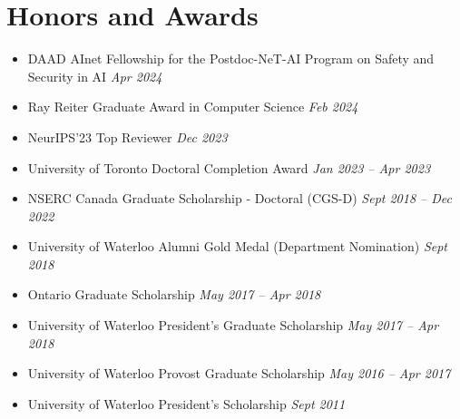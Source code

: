 \section*{Honors and Awards}
\vspace{\postsubhead}
\begin{adjustwidth}{\indentleft}{\indentright}
  \begin{itemize}
    \setlength\itemsep{0.2em}

    \item DAAD AInet Fellowship for the Postdoc-NeT-AI Program on Safety and Security in AI
    \hfill
    \textit{Apr 2024}
    
    \item Ray Reiter Graduate Award in Computer Science
    \hfill
    \textit{Feb 2024}

    \item NeurIPS'23 Top Reviewer
    \hfill
    \textit{Dec 2023}
    
    \item University of Toronto Doctoral Completion Award
    \hfill
    \textit{Jan 2023 -- Apr 2023}
    
    \item NSERC Canada Graduate Scholarship - Doctoral (CGS-D)
    \hfill
    \textit{Sept 2018 -- Dec 2022}
    
    \item University of Waterloo Alumni Gold Medal (Department Nomination)
    \hfill
    \textit{Sept 2018}
    
    \item Ontario Graduate Scholarship
    \hfill
    \textit{May 2017 -- Apr 2018}
    
    \item University of Waterloo President's Graduate Scholarship
    \hfill
    \textit{May 2017 -- Apr 2018}
    
    \item University of Waterloo Provost Graduate Scholarship
    \hfill
    \textit{May 2016 -- Apr 2017}
    
    \item University of Waterloo President's Scholarship
    \hfill
    \textit{Sept 2011}
    
    
    
    
  \end{itemize}
\end{adjustwidth}
